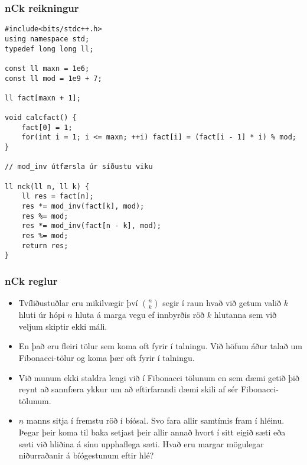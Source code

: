 \documentclass{beamer}
\begin{document}
\begin{frame}[fragile]
\frametitle{nCk reikningur}

\begin{scriptsize}
\begin{verbatim}
#include<bits/stdc++.h>
using namespace std;
typedef long long ll;

const ll maxn = 1e6;
const ll mod = 1e9 + 7;

ll fact[maxn + 1];

void calcfact() {
    fact[0] = 1;
    for(int i = 1; i <= maxn; ++i) fact[i] = (fact[i - 1] * i) % mod;
}

// mod_inv útfærsla úr síðustu viku

ll nck(ll n, ll k) {
    ll res = fact[n];
    res *= mod_inv(fact[k], mod);
    res %= mod;
    res *= mod_inv(fact[n - k], mod);
    res %= mod;
    return res;
}
\end{verbatim}
\end{scriptsize}

\end{frame}

\begin{frame}
\frametitle{nCk reglur}

\begin{itemize}

\item<1-> Tvíliðustuðlar eru mikilvægir því $\binom{n}{k}$ segir í raun hvað við getum valið $k$ hluti úr hópi $n$ hluta á marga vegu ef innbyrðis röð $k$ hlutanna sem við veljum skiptir ekki máli.

\item<2-> En það eru fleiri tölur sem koma oft fyrir í talningu. Við höfum áður talað um Fibonacci-tölur og koma þær oft fyrir í talningu. 

\item<3-> Við munum ekki staldra lengi við í Fibonacci tölunum en sem dæmi getið þið reynt að sannfæra ykkur um að eftirfarandi dæmi skili af sér Fibonacci-tölunum.

\item<4-> $n$ manns sitja í fremstu röð í bíósal. Svo fara allir samtímis fram í hléinu. Þegar þeir koma til baka setjast þeir allir annað hvort í sitt eigið sæti eða sæti við hliðina á sínu upphaflega sæti. Hvað eru margar mögulegar niðurraðanir á bíógestunum eftir hlé?

\end{itemize}

\end{frame}
\end{document}
